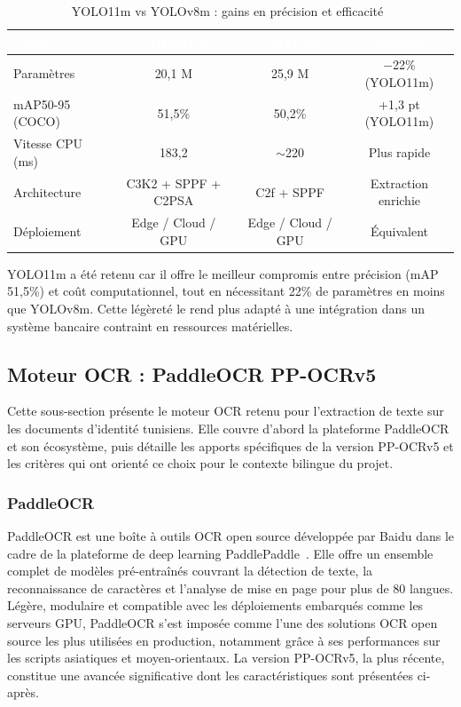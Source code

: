 \begin{table}[H]
  \centering
  \small
  \begin{tabular}{|l|c|c|c|}
    \toprule
    \rowcolor{bleu_principal}
    \textcolor{white}{\textbf{Critère}} & \textcolor{white}{\textbf{YOLO11m}} & \textcolor{white}{\textbf{YOLOv8m}} & \textcolor{white}{\textbf{Avantage}} \\
    \midrule
    Paramètres & 20,1 M & 25,9 M & $-$22\% (YOLO11m) \\
    \midrule
    \rowcolor{gris_leger}
    mAP50-95 (COCO) & 51,5\% & 50,2\% & +1,3 pt (YOLO11m) \\
    \midrule
    Vitesse CPU (ms) & 183,2 & $\sim$220 & Plus rapide \\
    \midrule
    \rowcolor{gris_leger}
    Architecture & C3K2 + SPPF + C2PSA & C2f + SPPF & Extraction enrichie \\
    \midrule
    Déploiement & Edge / Cloud / GPU & Edge / Cloud / GPU & Équivalent \\
    \bottomrule
  \end{tabular}
  \caption{YOLO11m vs YOLOv8m : gains en précision et efficacité~\cite{ultralytics_docs}}
  \label{tab:yolo11-vs-yolov8}
\end{table}

YOLO11m a été retenu car il offre le meilleur compromis entre précision (mAP 51,5\%) et coût computationnel, tout en nécessitant 22\% de paramètres en moins que YOLOv8m. Cette légèreté le rend plus adapté à une intégration dans un système bancaire contraint en ressources matérielles.

\subsection{Moteur OCR : PaddleOCR PP-OCRv5}
\label{subsec:pp-ocrv5}

Cette sous-section présente le moteur OCR retenu pour l'extraction de texte sur les documents d'identité tunisiens. Elle couvre d'abord la plateforme PaddleOCR et son écosystème, puis détaille les apports spécifiques de la version PP-OCRv5 et les critères qui ont orienté ce choix pour le contexte bilingue du projet.

\subsubsection{PaddleOCR}

PaddleOCR est une boîte à outils OCR open source développée par Baidu dans le cadre de la plateforme de deep learning PaddlePaddle~\cite{paddlepaddle_hf}. Elle offre un ensemble complet de modèles pré-entraînés couvrant la détection de texte, la reconnaissance de caractères et l'analyse de mise en page pour plus de 80 langues. Légère, modulaire et compatible avec les déploiements embarqués comme les serveurs GPU, PaddleOCR s'est imposée comme l'une des solutions OCR open source les plus utilisées en production, notamment grâce à ses performances sur les scripts asiatiques et moyen-orientaux. La version PP-OCRv5, la plus récente, constitue une avancée significative dont les caractéristiques sont présentées ci-après.

